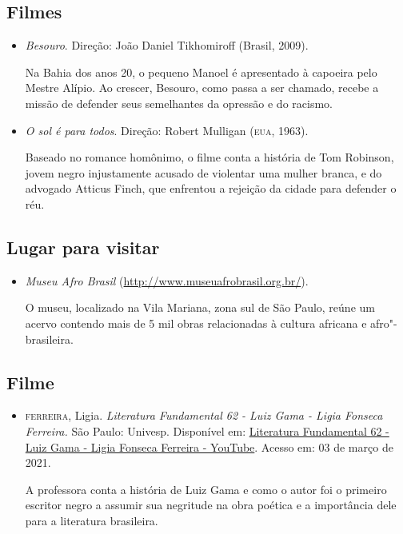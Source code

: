 \documentclass[12pt]{extarticle}
\begin{document}
\subsection{Filmes}
\begin{itemize}
\item\textit{Besouro}. Direção: João Daniel Tikhomiroff (Brasil, 2009).

Na Bahia dos anos 20, o pequeno Manoel é apresentado à capoeira pelo
Mestre Alípio. Ao crescer, Besouro, como passa a ser chamado, recebe a
missão de defender seus semelhantes da opressão e do racismo.

\item\textit{O sol é para todos}. Direção: Robert Mulligan (\textsc{eua}, 1963).

Baseado no romance homônimo, o filme conta a história de Tom Robinson,
jovem negro injustamente acusado de violentar uma mulher branca, e do
advogado Atticus Finch, que enfrentou a rejeição da cidade para defender
o réu.
\end{itemize}

\subsection{Lugar para visitar}

\begin{itemize}
\item\textit{Museu Afro Brasil}
(\url{http://www.museuafrobrasil.org.br/}).

O museu, localizado na Vila Mariana, zona sul de São Paulo, reúne um
acervo contendo mais de 5 mil obras relacionadas à cultura africana e
afro"-brasileira.
\end{itemize}

\subsection{Filme}
\begin{itemize}
\item\textsc{ferreira}, Ligia. \textit{Literatura Fundamental 62 - Luiz Gama - Ligia
Fonseca Ferreira.} São Paulo: Univesp. Disponível em:
\href{https://www.youtube.com/watch?v=WqSuNcU2jdA}{Literatura
Fundamental 62 - Luiz Gama - Ligia Fonseca Ferreira - YouTube}. Acesso
em: 03 de março de 2021.

A professora conta a história de Luiz Gama e como o autor foi o primeiro
escritor negro a assumir sua negritude na obra poética e a importância
dele para a literatura brasileira.
\end{itemize}
\end{document}
